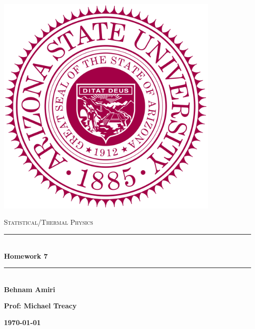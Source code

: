 \documentclass[fleqn]{article}
\begin{document}
  \begin{titlepage}

    \newcommand{\HRule}{\rule{\linewidth}{0.5mm}}

    \center

    \begin{center}
      \includegraphics[height=11cm, width=11cm]{asu.png}
    \end{center}

    \vline

    \textsc{\LARGE Statistical/Thermal Physics}\\[1.5cm]

    \HRule \\[0.5cm]
    { \huge \bfseries Homework 7}\\[0.4cm] 
    \HRule \\[1.0cm]

    \textbf{Behnam Amiri}

    \bigbreak

    \textbf{Prof: Michael Treacy}

    \bigbreak

    \textbf{{\large \today}\\[2cm]}

    \vfill

  \end{titlepage}
\end{document}
